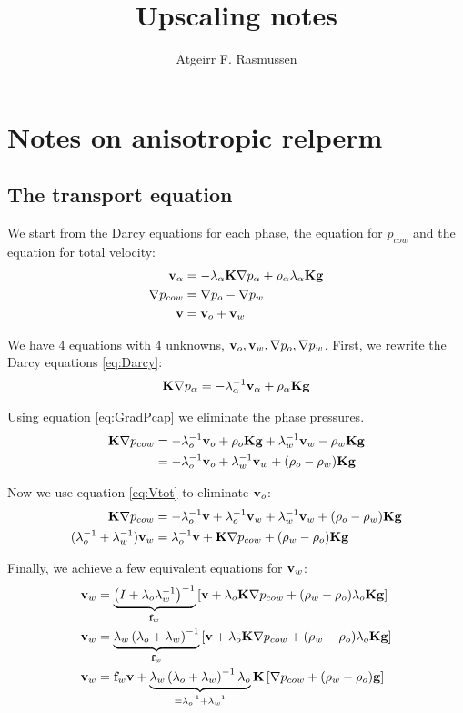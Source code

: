 \documentclass[12pt]{article}
\newcommand{\fb}{{\bf f}}
\newcommand{\gb}{{\bf g}}
\newcommand{\vb}{{\bf v}}
\newcommand{\Kb}{{\bf K}}
\begin{document}
\title{Upscaling notes}
\author{Atgeirr F. Rasmussen}


\section{Notes on anisotropic relperm}

\subsection{The transport equation}

We start from the Darcy equations for each phase, the equation for $p_{cow}$ and the equation for total velocity:
\begin{align}
\vb_\alpha & = -\lambda_\alpha\Kb\nabla p_\alpha + \rho_\alpha\lambda_\alpha\Kb\gb \label{eq:Darcy} \\
\nabla p_{cow} & = \nabla p_o - \nabla p_w \label{eq:GradPcap} \\
\vb & = \vb_o + \vb_w \label{eq:Vtot}
\end{align}

We have 4 equations with 4 unknowns, $\vb_o, \vb_w, \nabla p_o, \nabla p_w$. First, we rewrite the Darcy equations \eqref{eq:Darcy}:
\begin{align*}
 \Kb\nabla p_\alpha & = -\lambda_\alpha^{-1}\vb_\alpha + \rho_\alpha\Kb\gb \\
\end{align*}

Using equation \eqref{eq:GradPcap} we eliminate the phase pressures.
\begin{align*}
 \Kb\nabla p_{cow} & = -\lambda_o^{-1}\vb_o + \rho_o\Kb\gb 
  + \lambda_w^{-1}\vb_w - \rho_w\Kb\gb  \\
  & = -\lambda_o^{-1}\vb_o 
  + \lambda_w^{-1}\vb_w + (\rho_o - \rho_w)\Kb\gb  \\
\end{align*}

Now we use equation \eqref{eq:Vtot} to eliminate $\vb_o$:
\begin{align*}
 \Kb\nabla p_{cow}
  & = -\lambda_o^{-1}\vb + \lambda_o^{-1}\vb_w + \lambda_w^{-1}\vb_w + (\rho_o - \rho_w)\Kb\gb  \\
  (\lambda_o^{-1} + \lambda_w^{-1})\vb_w
  & = \lambda_o^{-1}\vb + \Kb\nabla p_{cow} + (\rho_w - \rho_o)\Kb\gb
\end{align*}

Finally, we achieve a few equivalent equations for $\vb_w$:
\begin{align*}
  \vb_w
  & = \underbrace{\left(I + \lambda_o\lambda_w^{-1}\right)^{-1}}_{\fb_w}
  \left[\vb + \lambda_o\Kb\nabla p_{cow} + (\rho_w - \rho_o)\lambda_o\Kb\gb\right] \\
  \vb_w
  & = \underbrace{\lambda_w\left(\lambda_o + \lambda_w\right)^{-1}}_{\fb_w}
  \left[\vb + \lambda_o\Kb\nabla p_{cow} + (\rho_w - \rho_o)\lambda_o\Kb\gb\right] \\
  \vb_w
  & = \fb_w \vb +
  \underbrace{\lambda_w\left(\lambda_o + \lambda_w\right)^{-1}\lambda_o}_{= \lambda_o^{-1} + \lambda_w^{-1}}
  \Kb\left[\nabla p_{cow} + (\rho_w - \rho_o)\gb\right] \\
\end{align*}
\end{document}
